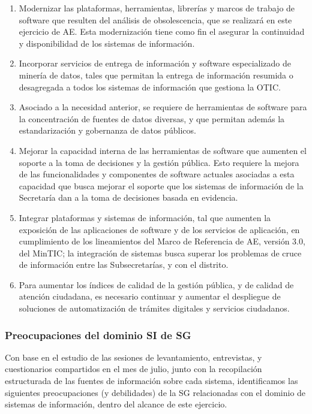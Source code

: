 \documentclass[
	a4paper, %
	12pt, %
]{include/CSSullivanBusinessReport}
\def\tightlist{}
\begin{document}
\begin{enumerate}
\def\labelenumi{\arabic{enumi}.}
\tightlist
\item
  Modernizar las plataformas, herramientas, librerías y marcos de
  trabajo de software que resulten del análisis de obsolescencia, que se
  realizará en este ejercicio de AE. Esta modernización tiene como fin
  el asegurar la continuidad y disponibilidad de los sistemas de
  información.
\item
  Incorporar servicios de entrega de información y software
  especializado de minería de datos, tales que permitan la entrega de
  información resumida o desagregada a todos los sistemas de información
  que gestiona la OTIC.
\item
  Asociado a la necesidad anterior, se requiere de herramientas de
  software para la concentración de fuentes de datos diversas, y que
  permitan además la estandarización y gobernanza de datos públicos.
\item
  Mejorar la capacidad interna de las herramientas de software que
  aumenten el soporte a la toma de decisiones y la gestión pública. Esto
  requiere la mejora de las funcionalidades y componentes de software
  actuales asociadas a esta capacidad que busca mejorar el soporte que
  los sistemas de información de la Secretaría dan a la toma de
  decisiones basada en evidencia.
\item
  Integrar plataformas y sistemas de información, tal que aumenten la
  exposición de las aplicaciones de software y de los servicios de
  aplicación, en cumplimiento de los lineamientos del Marco de
  Referencia de AE, versión 3.0, del MinTIC; la integración de sistemas
  busca superar los problemas de cruce de información entre las
  Subsecretarías, y con el distrito.
\item
  Para aumentar los índices de calidad de la gestión pública, y de
  calidad de atención ciudadana, es necesario continuar y aumentar el
  despliegue de soluciones de automatización de trámites digitales y
  servicios ciudadanos.
\end{enumerate}

\subsubsection{Preocupaciones del dominio SI de
SG}\label{sec:preocupaciones-del-dominio-si-de-sg}

Con base en el estudio de las sesiones de levantamiento, entrevistas, y
cuestionarios compartidos en el mes de julio, junto con la recopilación
estructurada de las fuentes de información sobre cada sistema,
identificamos las siguientes preocupaciones (y debilidades) de la SG
relacionadas con el dominio de sistemas de información, dentro del
alcance de este ejercicio.
\end{document}
